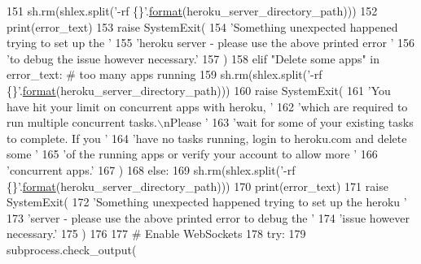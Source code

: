 \begin{DoxyCode}
151                     sh.rm(shlex.split(\textcolor{stringliteral}{'-rf \{\}'}.\hyperlink{namespaceparlai_1_1chat__service_1_1services_1_1messenger_1_1shared__utils_a32e2e2022b824fbaf80c747160b52a76}{format}(heroku\_server\_directory\_path)))
152                     print(error\_text)
153                     \textcolor{keywordflow}{raise} SystemExit(
154                         \textcolor{stringliteral}{'Something unexpected happened trying to set up the '}
155                         \textcolor{stringliteral}{'heroku server - please use the above printed error '}
156                         \textcolor{stringliteral}{'to debug the issue however necessary.'}
157                     )
158         \textcolor{keywordflow}{elif} \textcolor{stringliteral}{"Delete some apps"} \textcolor{keywordflow}{in} error\_text:  \textcolor{comment}{# too many apps running}
159             sh.rm(shlex.split(\textcolor{stringliteral}{'-rf \{\}'}.\hyperlink{namespaceparlai_1_1chat__service_1_1services_1_1messenger_1_1shared__utils_a32e2e2022b824fbaf80c747160b52a76}{format}(heroku\_server\_directory\_path)))
160             \textcolor{keywordflow}{raise} SystemExit(
161                 \textcolor{stringliteral}{'You have hit your limit on concurrent apps with heroku, '}
162                 \textcolor{stringliteral}{'which are required to run multiple concurrent tasks.\(\backslash\)nPlease '}
163                 \textcolor{stringliteral}{'wait for some of your existing tasks to complete. If you '}
164                 \textcolor{stringliteral}{'have no tasks running, login to heroku.com and delete some '}
165                 \textcolor{stringliteral}{'of the running apps or verify your account to allow more '}
166                 \textcolor{stringliteral}{'concurrent apps.'}
167             )
168         \textcolor{keywordflow}{else}:
169             sh.rm(shlex.split(\textcolor{stringliteral}{'-rf \{\}'}.\hyperlink{namespaceparlai_1_1chat__service_1_1services_1_1messenger_1_1shared__utils_a32e2e2022b824fbaf80c747160b52a76}{format}(heroku\_server\_directory\_path)))
170             print(error\_text)
171             \textcolor{keywordflow}{raise} SystemExit(
172                 \textcolor{stringliteral}{'Something unexpected happened trying to set up the heroku '}
173                 \textcolor{stringliteral}{'server - please use the above printed error to debug the '}
174                 \textcolor{stringliteral}{'issue however necessary.'}
175             )
176 
177     \textcolor{comment}{# Enable WebSockets}
178     \textcolor{keywordflow}{try}:
179         subprocess.check\_output(

\end{DoxyCode}
